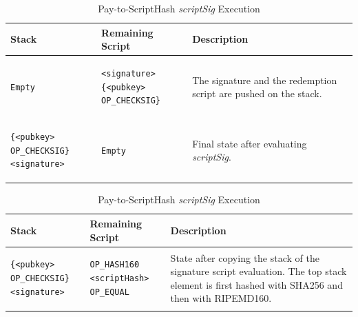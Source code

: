 \begin{table}[!ht]  
\begin{minipage}{\textwidth}

\centering
\begin{tabular}{| m{105pt} | m{135pt} | m{100pt} |}
\hline
\textbf{Stack} & \textbf{Remaining Script} & \textbf{Description} \\ \hline \hline

\vspace{8pt}
\begin{BVerbatim}[fontsize==\relsize{-4}]
Empty
\end{BVerbatim} 
\vspace{4pt}
&
\vspace{8pt}
\begin{BVerbatim}[fontsize==\relsize{-4}]
<signature>
{<pubkey> OP_CHECKSIG}
\end{BVerbatim} 
\vspace{4pt}
&
The signature and the redemption script are pushed on the stack. \\ \hline


\vspace{8pt}
\begin{BVerbatim}[fontsize==\relsize{-4}]
{<pubkey> OP_CHECKSIG}
<signature>
\end{BVerbatim} 
\vspace{4pt}
&
\vspace{8pt}
\begin{BVerbatim}[fontsize==\relsize{-4}]
Empty
\end{BVerbatim} 
\vspace{4pt}
&
Final state after evaluating \textit{scriptSig}. \\ \hline

\end{tabular}
\vspace{5pt}
\caption{Pay-to-ScriptHash \textit{scriptSig} Execution}
\label{tab:P2ScriptHash1}


\vspace{15pt}


\centering
\begin{tabular}{| m{105pt} | m{135pt} | m{100pt} |}
\hline
\textbf{Stack} & \textbf{Remaining Script} & \textbf{Description} \\ \hline \hline

\vspace{8pt}
\begin{BVerbatim}[fontsize==\relsize{-4}]
{<pubkey> OP_CHECKSIG}
<signature>
\end{BVerbatim} 
\vspace{4pt}
&
\vspace{8pt}
\begin{BVerbatim}[fontsize==\relsize{-4}]
OP_HASH160 <scriptHash>
OP_EQUAL
\end{BVerbatim} 
\vspace{4pt}
&
State after copying the stack of the signature script evaluation. The top stack element is first hashed with SHA256 and then with RIPEMD160.\\ \hline



\end{tabular}
\end{minipage}
\end{table}
